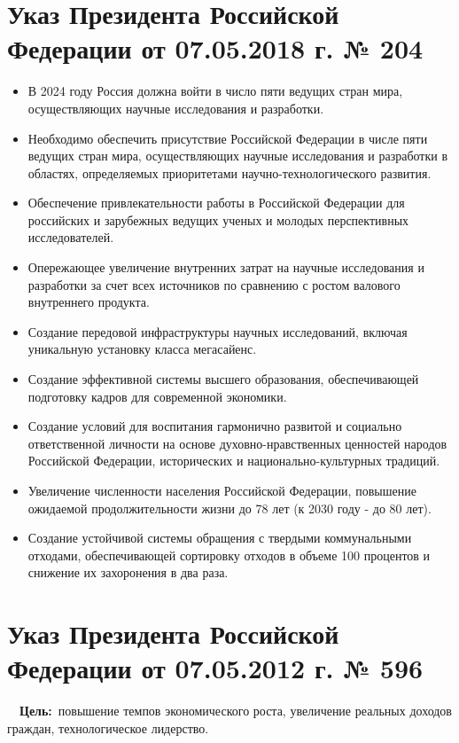 \documentclass[a4paper, fontsize=10bp]{article} %
\begin{document}
\section*{Указ Президента Российской Федерации от 07.05.2018 г. № 204}

\begin{itemize}
    \item В 2024 году Россия должна войти в число пяти ведущих стран мира, осуществляющих научные исследования и разработки.
    \item Необходимо обеспечить присутствие Российской Федерации в числе пяти ведущих стран мира, осуществляющих научные исследования и разработки в областях, определяемых приоритетами научно-технологического развития.
    \item Обеспечение привлекательности работы в Российской Федерации для российских и зарубежных ведущих ученых и молодых перспективных исследователей.
    \item Опережающее увеличение внутренних затрат на научные исследования и разработки за счет всех источников по сравнению с ростом валового внутреннего продукта.
    \item Создание передовой инфраструктуры научных исследований, включая уникальную установку класса мегасайенс.
    \item Создание эффективной системы высшего образования, обеспечивающей подготовку кадров для современной экономики.
    \item Создание условий для воспитания гармонично развитой и социально ответственной личности на основе духовно-нравственных ценностей народов Российской Федерации, исторических и национально-культурных традиций.
    \item Увеличение численности населения Российской Федерации, повышение ожидаемой продолжительности жизни до 78 лет (к 2030 году - до 80 лет).
    \item Создание устойчивой системы обращения с твердыми коммунальными отходами, обеспечивающей сортировку отходов в объеме 100 процентов и снижение их захоронения в два раза.
\end{itemize}



\section*{ Указ Президента Российской Федерации от 07.05.2012 г. № 596 }


    \quad \ \ {\bfseries Цель:}\ повышение темпов экономического роста, увеличение реальных доходов граждан, технологическое лидерство.
\end{document}
